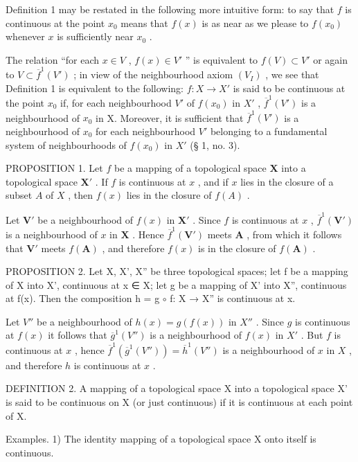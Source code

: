 Definition 1 may be restated in the following more intuitive form: to say that \(f\) is continuous at the point \(x_0\) means that \(f(x)\) is as near as we please to \(f(x_0)\) whenever \(x\) is sufficiently near \(x_0\) .

The relation ``for each \(x \in V\) , \(f(x) \in V'\) '' is equivalent to \(f(V) \subset V'\) or again to \(V \subset \overline{f}^{1}(V')\) ; in view of the neighbourhood axiom \((V_{I})\) , we see that Definition 1 is equivalent to the following: \(f: X \to X'\) is said to be continuous at the point \(x_{0}\) if, for each neighbourhood \(V'\) of \(f(x_{0})\) in \(X'\) , \(\overline{f}^{1}(V')\) is a neighbourhood of \(x_{0}\) in X. Moreover, it is sufficient that \(\overline{f}^{1}(V')\) is a neighbourhood of \(x_{0}\) for each neighbourhood \(V'\) belonging to a fundamental system of neighbourhoods of \(f(x_{0})\) in \(X'\) (§ 1, no. 3).

PROPOSITION 1. Let \(f\) be a mapping of a topological space \(\mathbf{X}\) into a topological space \(\mathbf{X}'\) . If \(f\) is continuous at \(x\) , and if \(x\) lies in the closure of a subset \(A\) of \(X\) , then \(f(x)\) lies in the closure of \(f(A)\) .

Let \(\mathbf{V}'\) be a neighbourhood of \(f(x)\) in \(\mathbf{X}'\) . Since \(f\) is continuous at \(x\) , \(\overline{f}^1 (\mathbf{V}')\) is a neighbourhood of \(x\) in \(\mathbf{X}\) . Hence \(\overline{f}^1 (\mathbf{V}')\) meets \(\mathbf{A}\) , from which it follows that \(\mathbf{V}'\) meets \(f(\mathbf{A})\) , and therefore \(f(x)\) is in the closure of \(f(\mathbf{A})\) .

PROPOSITION 2. Let X, X', X'' be three topological spaces; let f be a mapping of X into X', continuous at x ∈ X; let g be a mapping of X' into X'', continuous at f(x). Then the composition h = g \(\circ\) f: X → X'' is continuous at x.

Let \(V''\) be a neighbourhood of \(h(x) = g(f(x))\) in \(X''\) . Since \(g\) is continuous at \(f(x)\) it follows that \(\overline{g}^1(V'')\) is a neighbourhood of \(f(x)\) in \(X'\) . But \(f\) is continuous at \(x\) , hence \(\overline{f}^1(\overline{g}^1(V'')) = \overline{h}^1(V'')\) is a neighbourhood of \(x\) in \(X\) , and therefore \(h\) is continuous at \(x\) .

DEFINITION 2. A mapping of a topological space X into a topological space X' is said to be continuous on X (or just continuous) if it is continuous at each point of X.

Examples. 1) The identity mapping of a topological space X onto itself is continuous.


